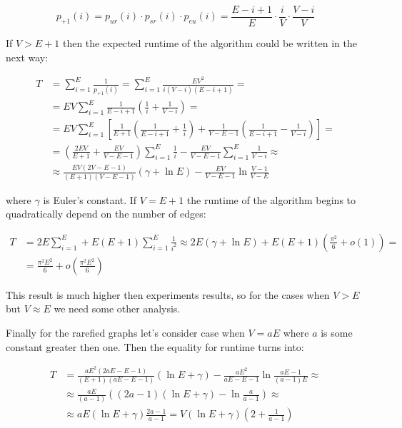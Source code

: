 \documentclass[a4paper,10pt]{article}
\theoremstyle{definition}
\begin{document}
 $$ p_{+1}(i) = p_{ur}(i) \cdot p_{sr}(i) \cdot p_{eu}(i) = \frac{E - i + 1}{E} \cdot \frac{i}{V} \cdot \frac{V - i}{V}$$
 
 If $V > E + 1$ then the expected runtime of the algorithm could be written in the next way:
 
 \begin{align*}
  T & = \sum_{i = 1}^E \frac{1}{p_{+1}(i)} = \sum_{i = 1}^E \frac{EV^2}{i(V - i)(E - i + 1)} = \\
    & = EV \sum_{i = 1}^E \frac{1}{E - i + 1} \left(\frac{1}{i} + \frac{1}{V - i} \right) = \\
    & = EV \sum_{i = 1}^E \left[ \frac{1}{E + 1} \left( \frac{1}{E - i + 1} + \frac{1}{i}\right) + \frac{1}{V - E - 1} \left( \frac{1}{E - i + 1} - \frac{1}{V - i} \right)\right] = \\
    & = \left( \frac{2EV}{E + 1} + \frac{EV}{V - E - 1}\right) \sum_{i = 1}^E \frac{1}{i} - \frac{EV}{V - E - 1} \sum_{i = 1}^E \frac{1}{V - i} \approx \\
    & \approx \frac{EV(2V - E - 1)}{(E + 1)(V - E - 1)}(\gamma + \ln{E}) - \frac{EV}{V - E - 1} \ln \frac{V - 1}{V - E}
 \end{align*}
 
 where $\gamma$ is Euler's constant. If $V = E + 1$ the runtime of the algorithm begins to quadratically depend on the number of edges:
 
 \begin{align*}
  T & = 2E \sum_{i = 1}^E + E(E + 1) \sum_{i = 1}^E \frac{1}{i^2} \approx 2E(\gamma + \ln{E}) + E(E + 1)(\frac{\pi^2}{6} + o(1)) = \\
    & = \frac{\pi^2 E^2}{6} + o(\frac{\pi^2 E^2}{6})
 \end{align*}

 This result is much higher then experiments results, so for the cases when $V > E$ but $V \approx E$ we need some other analysis.
 
 Finally for the rarefied graphs let's consider case when $V = aE$ where $a$ is some constant greater then one. Then the equality for runtime turns into:
 
 \begin{align*}
  T & = \frac{aE^2(2aE - E - 1)}{(E + 1)(aE - E - 1)} (\ln{E} + \gamma) - \frac{aE^2}{aE - E - 1} \ln \frac{aE - 1}{(a - 1) E} \approx \\
    & \approx \frac{aE}{(a - 1)} \left((2a - 1)(\ln{E} + \gamma) - \ln\frac{a}{a - 1} \right)\approx \\
    & \approx aE(\ln{E} + \gamma) \frac{2a - 1}{a - 1} = V(\ln{E} + \gamma)\left(2 + \frac{1}{a - 1}\right)
 \end{align*}
\end{document}
